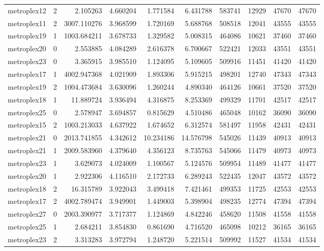 \documentclass[../../../thesis.tex]{subfiles}
\begin{document}
\begin{longtable}{|l|r|r|r|r|r|r|r|r|r|}
metroplex12 & 2 & 2.105263 & 4.660204 & 1.771584 & 6.431788 & 583741 & 12929 & 47670 & 47670 \\
metroplex11 & 2 & 3007.110276 & 3.968599 & 1.720169 & 5.688768 & 508518 & 12041 & 43555 & 43555 \\
metroplex19 & 1 & 1003.684211 & 3.678733 & 1.329582 & 5.008315 & 464086 & 10621 & 37460 & 37460 \\
metroplex20 & 0 & 2.553885 & 4.084289 & 2.616378 & 6.700667 & 522421 & 12033 & 43551 & 43551 \\
metroplex23 & 0 & 3.365915 & 3.985510 & 1.124095 & 5.109605 & 509916 & 11451 & 41420 & 41420 \\
metroplex17 & 1 & 4002.947368 & 4.021909 & 1.893306 & 5.915215 & 498201 & 12740 & 47343 & 47343 \\
metroplex19 & 2 & 1004.473684 & 3.630096 & 1.260244 & 4.890340 & 464126 & 10661 & 37520 & 37520 \\
metroplex18 & 1 & 11.889724 & 3.936494 & 4.316875 & 8.253369 & 499329 & 11701 & 42517 & 42517 \\
metroplex25 & 0 & 2.578947 & 3.694857 & 0.815629 & 4.510486 & 465048 & 10162 & 36090 & 36090 \\
metroplex15 & 2 & 1003.213033 & 4.637922 & 1.674652 & 6.312574 & 581497 & 11958 & 42431 & 42431 \\
metroplex21 & 0 & 2013.741855 & 4.342612 & 10.234186 & 14.576798 & 545026 & 11439 & 40913 & 40913 \\
metroplex21 & 1 & 2009.583960 & 4.379640 & 4.356123 & 8.735763 & 545066 & 11479 & 40973 & 40973 \\
metroplex23 & 1 & 3.629073 & 4.024009 & 1.100567 & 5.124576 & 509954 & 11489 & 41477 & 41477 \\
metroplex20 & 1 & 2.922306 & 4.116510 & 2.172733 & 6.289243 & 522435 & 12047 & 43572 & 43572 \\
metroplex18 & 2 & 16.315789 & 3.922043 & 3.499418 & 7.421461 & 499353 & 11725 & 42553 & 42553 \\
metroplex17 & 2 & 4002.789474 & 3.949901 & 1.449003 & 5.398904 & 498235 & 12774 & 47394 & 47394 \\
metroplex27 & 0 & 2003.390977 & 3.717377 & 1.124869 & 4.842246 & 458620 & 11508 & 41558 & 41558 \\
metroplex25 & 1 & 2.684211 & 3.854830 & 0.861690 & 4.716520 & 465098 & 10212 & 36165 & 36165 \\
metroplex23 & 2 & 3.313283 & 3.972794 & 1.248720 & 5.221514 & 509992 & 11527 & 41534 & 41534 \\

\end{longtable}
\end{document}
